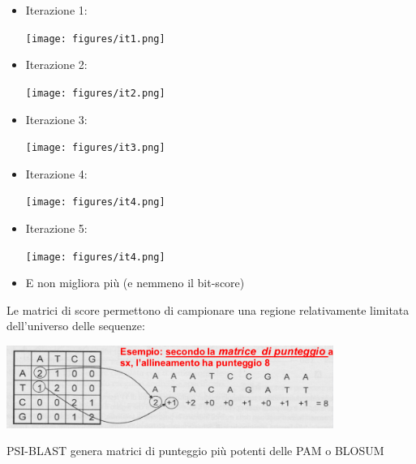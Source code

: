 \documentclass{article}
\begin{document}
\begin{itemize}
    \item Iterazione 1:\\
    \begin{center}
        \texttt{[image: figures/it1.png]}
    \end{center}
    \item Iterazione 2:\\
    \begin{center}
        \texttt{[image: figures/it2.png]}
    \end{center}
    \item Iterazione 3:\\
    \begin{center}
        \texttt{[image: figures/it3.png]}
    \end{center}
    \item Iterazione 4:\\
    \begin{center}
        \texttt{[image: figures/it4.png]}
    \end{center}
    \item Iterazione 5:\\
    \begin{center}
        \texttt{[image: figures/it4.png]}
    \end{center}
    \item E non migliora più (e nemmeno il bit-score)
\end{itemize}
Le matrici di score permettono di campionare una regione
relativamente limitata dell'universo delle sequenze:
\begin{center}
    \includegraphics[width=0.8\textwidth]{figures/mat.png}
\end{center}
PSI-BLAST genera matrici di punteggio più potenti delle PAM o BLOSUM
\end{document}
